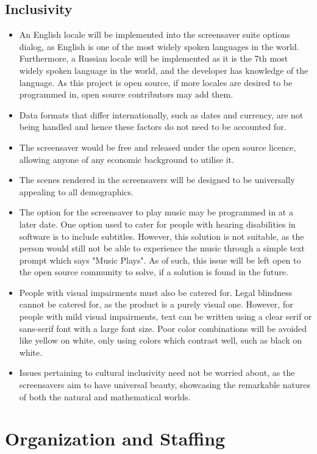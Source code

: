 \documentclass[10pt, openany]{book}
\begin{document}
\subsection{Inclusivity}
\begin{itemize}
	\item An English locale will be implemented into the screensaver
suite options dialog, as English is one of the most widely spoken languages in the world. Furthermore, a Russian locale will be implemented as it is the 7th most widely spoken language in the world, and the developer has knowledge of the language. As this project is open source, if more locales are desired to be programmed in, open source contributors may add them.
	\item Data formats that differ internationally, such as dates and currency, are not being handled and hence these factors do not need to be accounted for.
	\item The screensaver would be free and released under the open source licence, allowing anyone of any economic background to utilise it.
	\item The scenes rendered in the screensavers will be designed to be universally appealing to all demographics.	
	\item The option for the screensaver to play music may be programmed in at a later date. One option used to cater for people with hearing disabilities in software is to include subtitles. However, this solution is not suitable, as the person would still not be able to experience the music through a simple text prompt which says "Music Plays". As of such, this issue will be left open to the open source community to solve, if a solution is found in the future.
	\item People with visual impairments must also be catered for. Legal blindness cannot be catered for, as the product is a purely visual one. However, for people with mild visual impairments, text can be written using a clear serif or sans-serif font with a large font size. Poor color combinations will be avoided like yellow on white, only using colors which contrast well, such as black on white.
	\item Issues pertaining to cultural inclusivity need not be worried about, as the screensavers aim to have universal beauty, showcasing the remarkable natures of both the natural and mathematical worlds. 	
\end{itemize}	

\section{Organization and Staffing}
\end{document}
